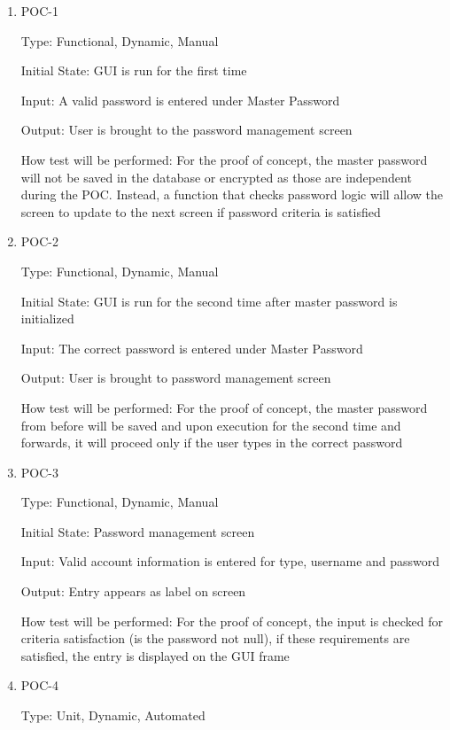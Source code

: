\documentclass[12pt, titlepage]{article}
\begin{document}
\begin{enumerate}

\item{POC-1\\}

Type: Functional, Dynamic, Manual

Initial State: GUI is run for the first time

Input: A valid password is entered under Master Password

Output: User is brought to the password management screen

How test will be performed: For the proof of concept, the master password will not be saved in the database or encrypted as those are independent during the POC. Instead, a function that checks password logic will allow the screen to update to the next screen if password criteria is satisfied

\item{POC-2\\}
					
Type: Functional, Dynamic, Manual

Initial State: GUI is run for the second time after master password is initialized

Input: The correct password is entered under Master Password

Output: User is brought to password management screen

How test will be performed: For the proof of concept, the master password from before will be saved and upon execution for the second time and forwards, it will proceed only if the user types in the correct password

\item{POC-3\\}

Type: Functional, Dynamic, Manual

Initial State: Password management screen

Input: Valid account information is entered for type, username and password

Output: Entry appears as label on screen 

How test will be performed: For the proof of concept, the input is checked for criteria satisfaction (is the password not null), if these requirements are satisfied, the entry is displayed on the GUI frame

\item{POC-4\\}

Type: Unit, Dynamic, Automated


\end{enumerate}
\end{document}
